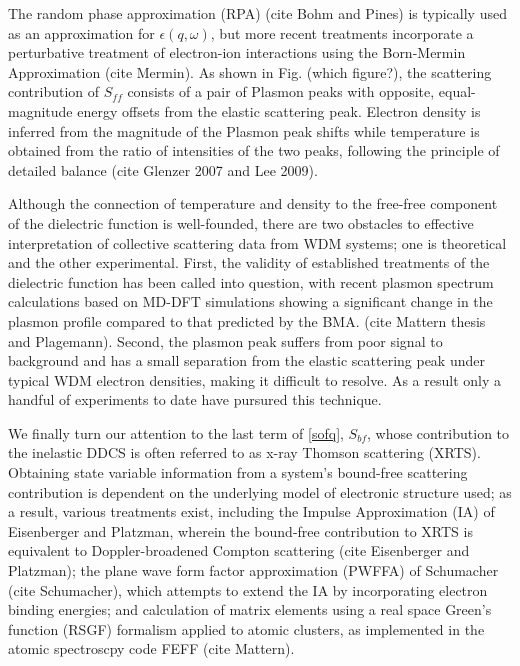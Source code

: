 The random phase approximation (RPA) (cite Bohm and Pines) is typically used as an approximation for $\epsilon(q, \omega)$, but more recent treatments incorporate a perturbative treatment of electron-ion interactions using the Born-Mermin Approximation (cite Mermin). As shown in Fig. (which figure?), the scattering contribution of $S_{ff}$ consists of a pair of Plasmon peaks with opposite, equal-magnitude energy offsets from the elastic scattering peak. Electron density is inferred from the magnitude of the Plasmon peak shifts while temperature is obtained from the ratio of intensities of the two peaks, following the principle of detailed balance (cite Glenzer 2007 and Lee 2009).

Although the connection of temperature and density to the free-free component of the dielectric function is well-founded, there are two obstacles to effective interpretation of collective scattering data from WDM systems; one is theoretical and the other experimental. First, the validity of established treatments of the dielectric function has been called into question, with recent plasmon spectrum calculations based on MD-DFT simulations showing a significant change in the plasmon profile compared to that predicted by the BMA. (cite Mattern thesis and Plagemann). Second, the plasmon peak suffers from poor signal to background and has a small separation from the elastic scattering peak under typical WDM electron densities, making it difficult to resolve. As a result only a handful of experiments to date have pursured this technique. 

We finally turn our attention to the last term of \ref{sofq}, $S_{bf}$, whose contribution to the inelastic DDCS is often referred to as x-ray Thomson scattering (XRTS). Obtaining state variable information from a system's bound-free scattering contribution is dependent on the underlying model of electronic structure used; as a result, various treatments exist, including the Impulse Approximation (IA) of Eisenberger and Platzman, wherein the bound-free contribution to XRTS is equivalent to Doppler-broadened Compton scattering (cite Eisenberger and Platzman); the plane wave form factor approximation (PWFFA) of Schumacher (cite Schumacher), which attempts to extend the IA by incorporating electron binding energies; and calculation of matrix elements using a real space Green's function (RSGF) formalism applied to atomic clusters, as implemented in the atomic spectroscpy code FEFF (cite Mattern).


